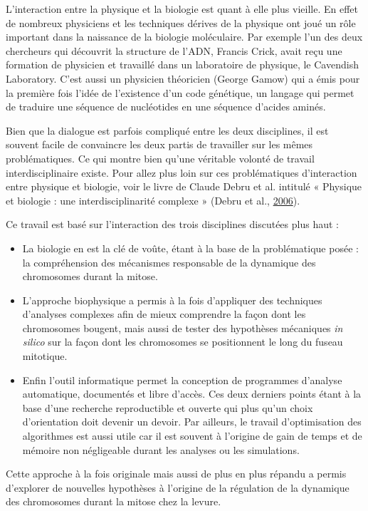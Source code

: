 \documentclass[12pt,a4paper,twoside,openright]{book}
\begin{document}
L'interaction entre la physique et la biologie est quant à elle plus
vieille. En effet de nombreux physiciens et les techniques dérives de la
physique ont joué un rôle important dans la naissance de la biologie
moléculaire. Par exemple l'un des deux chercheurs qui découvrit la
structure de l'ADN, Francis Crick, avait reçu une formation de physicien
et travaillé dans un laboratoire de physique, le Cavendish Laboratory.
C'est aussi un physicien théoricien (George Gamow) qui a émis pour la
première fois l'idée de l'existence d'un code génétique, un langage qui
permet de traduire une séquence de nucléotides en une séquence d'acides
aminés.

Bien que la dialogue est parfois compliqué entre les deux disciplines,
il est souvent facile de convaincre les deux partis de travailler sur
les mêmes problématiques. Ce qui montre bien qu'une véritable volonté de
travail interdisciplinaire existe. Pour allez plus loin sur ces
problématiques d'interaction entre physique et biologie, voir le livre
de Claude Debru et al. intitulé « Physique et biologie : une
interdisciplinarité complexe » (Debru et al.,
\hyperref[ref-Debru]{2006}).

Ce travail est basé sur l'interaction des trois disciplines discutées
plus haut :

\begin{itemize}
\item
  La biologie en est la clé de voûte, étant à la base de la
  problématique posée : la compréhension des mécanismes responsable de
  la dynamique des chromosomes durant la mitose.
\item
  L'approche biophysique a permis à la fois d'appliquer des techniques
  d'analyses complexes afin de mieux comprendre la façon dont les
  chromosomes bougent, mais aussi de tester des hypothèses mécaniques
  \emph{in silico} sur la façon dont les chromosomes se positionnent le
  long du fuseau mitotique.
\item
  Enfin l'outil informatique permet la conception de programmes
  d'analyse automatique, documentés et libre d'accès. Ces deux derniers
  points étant à la base d'une recherche reproductible et ouverte qui
  plus qu'un choix d'orientation doit devenir un devoir. Par ailleurs,
  le travail d'optimisation des algorithmes est aussi utile car il est
  souvent à l'origine de gain de temps et de mémoire non négligeable
  durant les analyses ou les simulations.
\end{itemize}

Cette approche à la fois originale mais aussi de plus en plus répandu a
permis d'explorer de nouvelles hypothèses à l'origine de la régulation
de la dynamique des chromosomes durant la mitose chez la levure.
\end{document}

